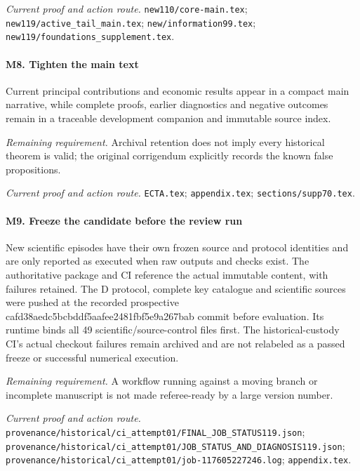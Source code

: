 \par\emph{Current proof and action route.} \nolinkurl{new110/core-main.tex}; \nolinkurl{new119/active_tail_main.tex}; \nolinkurl{new/information99.tex}; \nolinkurl{new119/foundations_supplement.tex}.

\paragraph{M8. Tighten the main text}

Current principal contributions and economic results appear in a compact main narrative, while complete proofs, earlier diagnostics and negative outcomes remain in a traceable development companion and immutable source index.

\par\emph{Remaining requirement.} Archival retention does not imply every historical theorem is valid; the original corrigendum explicitly records the known false propositions.

\par\emph{Current proof and action route.} \nolinkurl{ECTA.tex}; \nolinkurl{appendix.tex}; \nolinkurl{sections/supp70.tex}.

\paragraph{M9. Freeze the candidate before the review run}

New scientific episodes have their own frozen source and protocol identities and are only reported as executed when raw outputs and checks exist. The authoritative package and CI reference the actual immutable content, with failures retained. The D protocol, complete key catalogue and scientific sources were pushed at the recorded prospective cafd38aedc5bcbddf5aafee2481fbf5e9a267bab commit before evaluation. Its runtime binds all 49 scientific/\allowbreak{}source-control files first. The historical-custody CI's actual checkout failures remain archived and are not relabeled as a passed freeze or successful numerical execution.

\par\emph{Remaining requirement.} A workflow running against a moving branch or incomplete manuscript is not made referee-ready by a large version number.

\par\emph{Current proof and action route.} \nolinkurl{provenance/historical/ci_attempt01/FINAL_JOB_STATUS119.json}; \nolinkurl{provenance/historical/ci_attempt01/JOB_STATUS_AND_DIAGNOSIS119.json}; \nolinkurl{provenance/historical/ci_attempt01/job-117605227246.log}; \nolinkurl{appendix.tex}.

